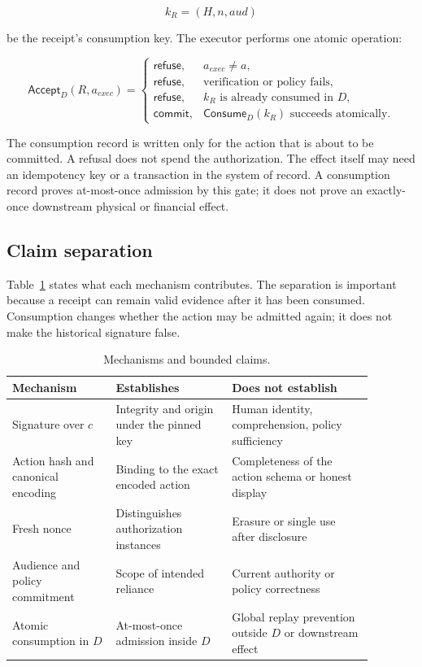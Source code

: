 \documentclass[10.5pt]{article}
\newcommand{\Accept}{\mathsf{Accept}}
\newcommand{\Consume}{\mathsf{Consume}}
\begin{document}
\begin{equation}
  k_R = (H,n,aud)
\end{equation}

be the receipt's consumption key. The executor performs one atomic operation:

\begin{equation}
  \Accept_D(R,a_{exec}) =
  \begin{cases}
  \mathsf{refuse}, & a_{exec} \ne a,\\
  \mathsf{refuse}, & \text{verification or policy fails},\\
  \mathsf{refuse}, & k_R \text{ is already consumed in }D,\\
  \mathsf{commit}, & \Consume_D(k_R)\text{ succeeds atomically}.
  \end{cases}
\end{equation}

The consumption record is written only for the action that is about to be
committed. A refusal does not spend the authorization. The effect itself may need
an idempotency key or a transaction in the system of record. A consumption record
proves at-most-once admission by this gate; it does not prove an exactly-once
downstream physical or financial effect.

\subsection{Claim separation}

Table~\ref{tab:claims} states what each mechanism contributes. The separation is
important because a receipt can remain valid evidence after it has been consumed.
Consumption changes whether the action may be admitted again; it does not make the
historical signature false.

\begin{table}[h]
\centering
\small
\begin{tabular}{p{0.25\linewidth}p{0.29\linewidth}p{0.34\linewidth}}
\toprule
Mechanism & Establishes & Does not establish \\
\midrule
Signature over $c$ & Integrity and origin under the pinned key & Human identity, comprehension, policy sufficiency \\
Action hash and canonical encoding & Binding to the exact encoded action & Completeness of the action schema or honest display \\
Fresh nonce & Distinguishes authorization instances & Erasure or single use after disclosure \\
Audience and policy commitment & Scope of intended reliance & Current authority or policy correctness \\
Atomic consumption in $D$ & At-most-once admission inside $D$ & Global replay prevention outside $D$ or downstream effect \\
\bottomrule
\end{tabular}
\caption{Mechanisms and bounded claims.}
\label{tab:claims}
\end{table}
\end{document}

